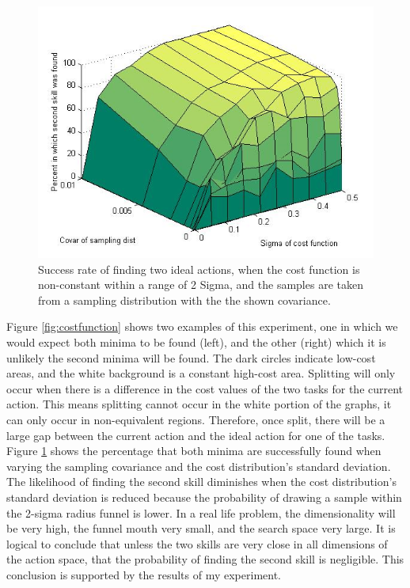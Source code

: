 \documentclass[12pt]{article}
\begin{document}
\begin{figure}[ht]
  \centering
  \includegraphics[width=0.9\columnwidth]{sigma_vs_covar.png}
  \caption{\label{fig_label} Success rate of finding two ideal actions, when the cost function is non-constant within a range of 2 Sigma, and the samples are taken from a sampling distribution with the the shown covariance. }
  \label{fig:sigmavscovar}
\end{figure}

Figure \ref{fig:costfunction} shows two examples of this experiment, one in which we would expect both minima to be found (left), and the other (right) which it is unlikely the second minima will be found. The dark circles indicate low-cost areas, and the white background is a constant high-cost area. Splitting will only occur when there is a difference in the cost values of the two tasks for the current action. This means splitting cannot occur in the white portion of the graphs, it can only occur in non-equivalent regions. Therefore, once split, there will be a large gap between the current action and the ideal action for one of the tasks. Figure \ref{fig:sigmavscovar} shows the percentage that both minima are successfully found when varying the sampling covariance and the cost distribution's standard deviation. The likelihood of finding the second skill diminishes when the cost distribution's standard deviation is reduced because the probability of drawing a sample within the 2-sigma radius funnel is lower. In a real life problem, the dimensionality will be very high, the funnel mouth very small, and the search space very large. It is logical to conclude that unless the two skills are very close in all dimensions of the action space, that the probability of finding the second skill is negligible. This conclusion is supported by the results of my experiment.
\end{document}

